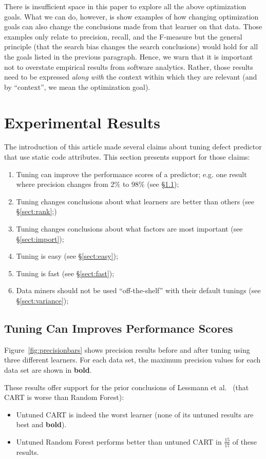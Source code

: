\documentclass{sig-alternative}
\newcommand{\bi}{\begin{itemize}[leftmargin=0.4cm]}
\newcommand{\ei}{\end{itemize}}
\newcommand{\be}{\begin{enumerate}}
\newcommand{\ee}{\end{enumerate}}
\newcommand{\tion}[1]{\S\ref{sect:#1}}
\newcommand{\fig}[1]{Figure~\ref{fig:#1}}
\begin{document}
There is insufficient space in this paper to explore all the above optimization goals.
What we can do, however, is show examples of how  changing  optimization goals can also change 
the conclusions made from that learner on that data. Those examples only relate to precision, recall, and the F-measure
but the general principle (that the search bias changes the search conclusions) would hold for all the goals
listed in the previous paragraph.  Hence, we warn that it is important not to overstate  empirical results from software analytics.
Rather, those results need to be expressed {\em along with} the context within which they are
relevant (and by ``context'', we mean the optimization goal).


\section{Experimental Results}

The introduction of this article made several claims about tuning defect predictor
that use static code attributes. This section presents
support for those claims:
\be
\item  Tuning  can  improve the performance scores of a predictor;
e.g. one result where precision changes from 2\% to 98\% (see \tion{precision});
\item Tuning changes conclusions about what learners are better than others (see \tion{rank};)
\item Tuning changes conclusions about what factors are most important (see \tion{import});
\item  Tuning is easy (see \tion{easy});
\item Tuning is fast (see \tion{fast});
\item Data miners should not be used ``off-the-shelf'' with their default tunings (see \tion{variance});
\ee



\subsection{Tuning Can  Improves Performance Scores}\label{sect:precision}

\fig{precisionbars} shows precision results before and after tuning using three different learners.
For each data set, the maximum precision values for each data set are shown in {\bf bold}.


These results offer support for the prior conclusions of  
 Lessmann et al.~\cite{lessmann2008benchmarking} (that CART is worse than Random Forest):
\bi
\item
Untuned CART is indeed the worst learner (none of its
untuned results are best and {\bf bold}). 
\item 
Untuned Random Forest performs better than untuned CART in $\frac{15}{17}$ of these results.
\ei
\end{document}
